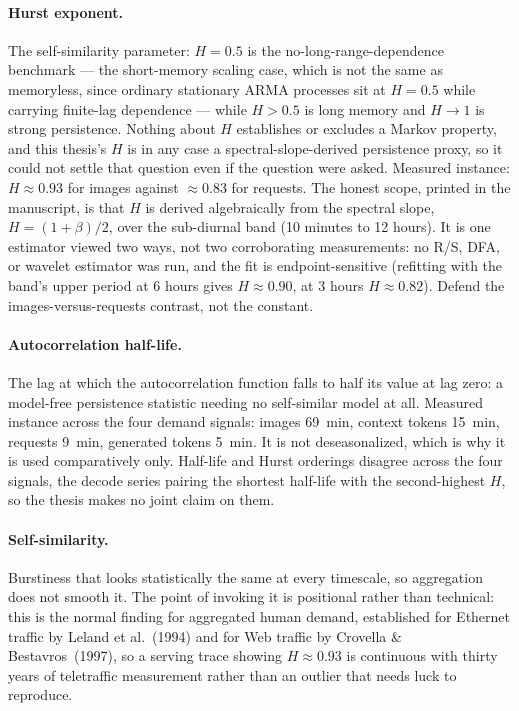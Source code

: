 \documentclass[11pt,a4paper]{article}
\def\emph#1{#1}\def\texttt#1{#1}%
\begin{document}
\paragraph{Hurst exponent.} The self-similarity parameter: $H = 0.5$ is the
\emph{no-long-range-dependence} benchmark --- the short-memory scaling case,
which is \emph{not} the same as memoryless, since ordinary stationary ARMA
processes sit at $H = 0.5$ while carrying finite-lag dependence --- while
$H > 0.5$ is long memory and $H \to 1$ is strong persistence. Nothing about
$H$ establishes or excludes a Markov property, and this thesis's $H$ is in
any case a spectral-slope-derived persistence proxy, so it could not settle
that question even if the question were asked. Measured instance: $H \approx 0.93$ for images against
${\approx}0.83$ for requests. The honest scope, printed in the manuscript, is
that $H$ is derived algebraically from the spectral slope,
$H = (1{+}\beta)/2$, over the sub-diurnal band (10 minutes to 12 hours). It
is one estimator viewed two ways, not two corroborating measurements: no
R/S, DFA, or wavelet estimator was run, and the fit is endpoint-sensitive
(refitting with the band's upper period at 6 hours gives $H \approx 0.90$, at
3 hours $H \approx 0.82$). Defend the images-versus-requests \emph{contrast},
not the constant.

\paragraph{Autocorrelation half-life.} The lag at which the autocorrelation
function falls to half its value at lag zero: a model-free persistence
statistic needing no self-similar model at all. Measured instance across the
four demand signals: images \SI{69}{\minute}, context tokens
\SI{15}{\minute}, requests \SI{9}{\minute}, generated tokens
\SI{5}{\minute}. It is \emph{not} deseasonalized, which is why it is used
comparatively only. Half-life and Hurst orderings disagree across the four
signals, the decode series pairing the shortest half-life with the
second-highest $H$, so the thesis makes no joint claim on them.

\paragraph{Self-similarity.} Burstiness that looks statistically the same at
every timescale, so aggregation does not smooth it. The point of invoking it
is positional rather than technical: this is the \emph{normal} finding for
aggregated human demand, established for Ethernet traffic by Leland et
al.~(1994) and for Web traffic by Crovella \& Bestavros~(1997), so a serving
trace showing $H \approx 0.93$ is continuous with thirty years of
teletraffic measurement rather than an outlier that needs luck to reproduce.
\end{document}
